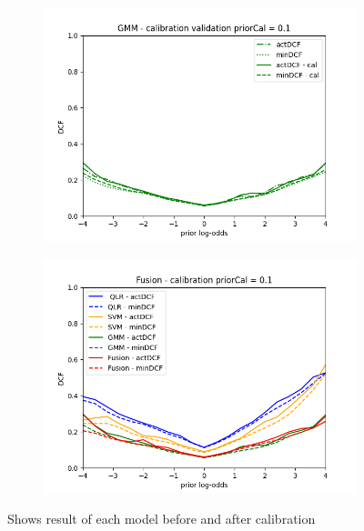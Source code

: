 \begin{figure}[h!]
\begin{subfigure}[b]{0.40\linewidth}
        \includegraphics[width=\linewidth]{Lab/11. Lab 11/Images/CalibrationAndFusion/03. GMM}
        \label{fig:GMMCalibration}
    \end{subfigure}
    \begin{subfigure}[b]{0.40\linewidth}
        \includegraphics[width=\linewidth]{Lab/11. Lab 11/Images/CalibrationAndFusion/04. Fusion}
        \label{fig:FusionCalibration}
    \end{subfigure}
    \caption{Shows result of each model before and after calibration}
    \label{fig:BestConfigurationCalibration}
\end{figure}


